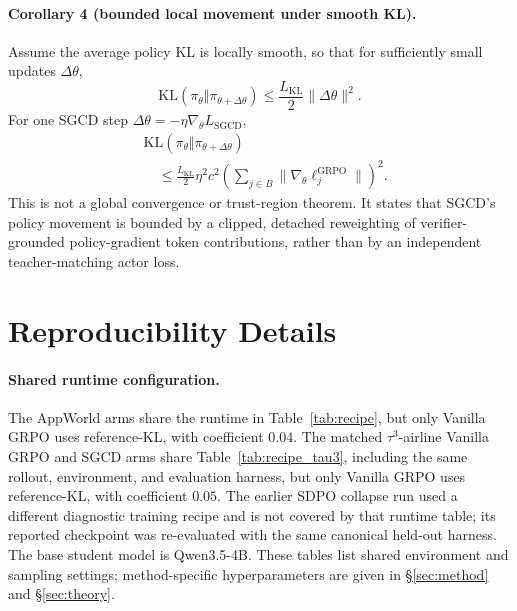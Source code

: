 \paragraph{Corollary 4 (bounded local movement under smooth KL).}
Assume the average policy KL is locally smooth, so that for sufficiently small
updates $\Delta\theta$,
\[
  \mathrm{KL}(\pi_\theta\Vert\pi_{\theta+\Delta\theta})
  \le
  \frac{L_{\mathrm{KL}}}{2}\|\Delta\theta\|^2 .
\]
For one SGCD step $\Delta\theta=-\eta\nabla_\theta L_{\mathrm{SGCD}}$,
\[
  \begin{aligned}
  &\mathrm{KL}(\pi_\theta\Vert\pi_{\theta+\Delta\theta})\\
  &\quad\le
  \frac{L_{\mathrm{KL}}}{2}
  \eta^2c^2
  \left(
  \sum_{j\in B}
  \|\nabla_\theta \ell_j^{\mathrm{GRPO}}\|
  \right)^2 .
  \end{aligned}
\]
This is not a global convergence or trust-region theorem. It states that SGCD's
policy movement is bounded by a clipped, detached reweighting of
verifier-grounded policy-gradient token contributions, rather than by an
independent teacher-matching actor loss.

\section{Reproducibility Details}
\label{sec:appendix}

\paragraph{Shared runtime configuration.} The AppWorld arms share the runtime
in Table~\ref{tab:recipe}, but only Vanilla GRPO uses reference-KL, with
coefficient $0.04$. The matched $\tau^3$-airline Vanilla GRPO and SGCD arms
share Table~\ref{tab:recipe_tau3}, including the same rollout, environment, and
evaluation harness, but only Vanilla GRPO uses reference-KL, with coefficient
$0.05$. The earlier SDPO collapse
run used a different diagnostic training recipe and is not covered by that
runtime table; its reported checkpoint was re-evaluated with the same canonical
held-out harness. The base student model is Qwen3.5-4B. These tables list shared
environment and sampling settings; method-specific hyperparameters are given in
\S\ref{sec:method} and \S\ref{sec:theory}.

